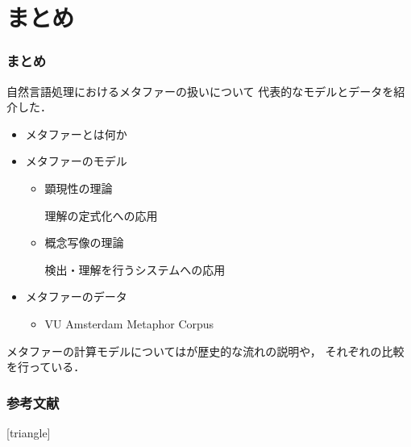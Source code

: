 \documentclass[11pt]{beamer}
\newlength{\la}
\let\oldcite=\citet
\renewcommand\citet[1]{\hyperlink{#1}{\oldcite{#1}}}
\let\oldcitep=\citep
\renewcommand\citep[1]{\hyperlink{#1}{\oldcitep{#1}}}
\begin{document}
\section{まとめ}
\begin{frame}
\frametitle{まとめ}
    自然言語処理におけるメタファーの扱いについて
    代表的なモデルとデータを紹介した．
    \begin{itemize}
        \item メタファーとは何か
        \item メタファーのモデル
            \begin{itemize}
                \item 顕現性の理論\citep{tversky, ortony}

                    理解の定式化への応用\citep{iwayama}

                \item 概念写像の理論\citep{lakoff1980}

                    検出・理解を行うシステムへの応用\citep{shutova2013}

            \end{itemize}
        \item メタファーのデータ
            \begin{itemize}
                \item VU Amsterdam Metaphor Corpus \citep{steen2010}
            \end{itemize}
    \end{itemize}
    メタファーの計算モデルについては\citet{utsumi}が歴史的な流れの説明や，
    それぞれの比較を行っている．
\end{frame}

\begin{frame}[allowframebreaks]
\frametitle{参考文献}
\begingroup
\scriptsize
    [triangle]
    
    
\endgroup
\end{frame}
\end{document}
